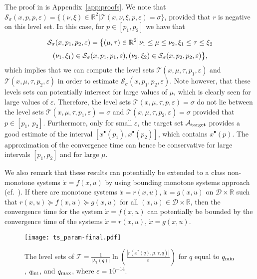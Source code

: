 \documentclass[letterpaper, 10pt, journal]{IEEEtran}  %
\newcommand{\R}{{\mathbb R}}
\newcommand{\cA}{{\mathcal A}}
\newcommand{\cD}{{\mathcal D}}
\newcommand{\cS}{{\mathcal S}}
\newcommand{\cT}{{\mathcal T}}
\begin{document}
The proof in is Appendix~\ref{app:proofs}. We note that $\cS_\sigma(x, p, p, \varepsilon) = \{ (\nu, \xi) \in \R^2\bigl| \cT(x,\nu,\xi,p, \varepsilon) = \sigma \}$, provided that $r$ is negative on this level set. In this case, for $p \in [p_1, p_2]$ we have that  
\begin{multline*}
\cS_\sigma(x, p_1, p_2, \varepsilon) = \bigl\{(\mu,\tau)\in\R^2\Bigl| \nu_1 \le \mu \le \nu_2, \xi_1 \le \tau \le \xi_2 \\
(\nu_1,\xi_1) \in \cS_\sigma(x, p_1, p_1,\varepsilon), (\nu_2,\xi_2) \in \cS_\sigma(x, p_2, p_2, \varepsilon)   \bigl\},
\end{multline*}	
which implies that we can compute the level sets $\cT(x,\mu,\tau, p_1,\varepsilon)$ and $\cT(x,\mu,\tau, p_2,\varepsilon)$ in order to estimate $\cS_\sigma(x, p_1, p_2, \varepsilon)$. Note however, that these levels sets can potentially intersect for large values of $\mu$, which is clearly seen for large values of $\varepsilon$. Therefore, the level sets $\cT(x,\mu,\tau, p,\varepsilon) = \sigma$ do not lie between the level sets $\cT(x,\mu,\tau, p_1,\varepsilon) = \sigma$ and $\cT(x,\mu,\tau, p_2,\varepsilon) = \sigma$ provided that $p\in[p_1,~p_2]$.
Furthermore, only for small $\varepsilon$, the target set $\cA_{\rm target}$ provides a good estimate of the interval $[x^\bullet(p_1), x^\bullet(p_2)]$, which contains $x^\bullet(p)$. The approximation of the convergence time can hence be conservative for large intervals $[p_1, p_2]$ and for large $\mu$. 

We also remark that these results can potentially be extended to a class non-monotone systems $\dot x = f(x, u)$ by using bounding monotone systems approach (cf.~\cite{gouze2000interval}). If there are monotone systems $\dot x = r(x, u)$, $\dot x = g(x,u)$ on $\cD\times \R$ such that $r(x,u) \succeq f(x,u) \succeq g(x,u)$ for all $(x,u) \in \cD\times \R$, then the convergence time for the system $\dot x = f(x, u)$ can potentially be bounded by the convergence time of the systems $\dot x = r(x, u)$, $\dot x = g(x,u)$. 
\begin{figure}[t]
	\centering
	\texttt{[image: ts\_param-final.pdf]}
	\caption{The level sets of $\cT = \frac{1}{|\lambda_1(q)|} \ln \left(\frac{|r(x^\ast(q), \mu, \tau, q)|}{\varepsilon} \right)$ for $q$ equal to $q_{\rm min}$, $q_{\rm int}$, and $q_{\rm max}$, where $\varepsilon = 10^{-14}$.} \label{fig:switching-iso-ts}
\end{figure}
\end{document}
